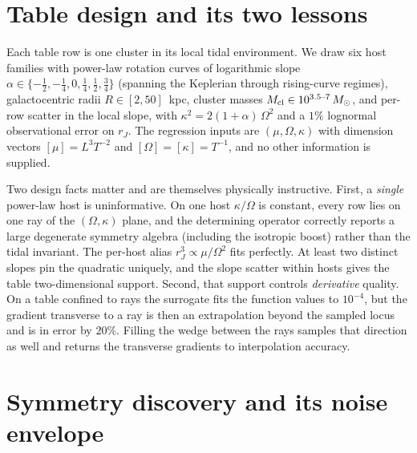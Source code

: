\documentclass[11pt]{article}
\begin{document}
\section{Table design and its two lessons}

Each table row is one cluster in its local tidal environment.  We draw
six host families with power-law rotation curves of logarithmic slope
$\alpha\in\{-\tfrac12,-\tfrac14,0,\tfrac14,\tfrac12,\tfrac34\}$
(spanning the Keplerian through rising-curve regimes), galactocentric
radii $R\in[2,50]$~kpc, cluster masses
$M_{\rm cl}\in10^{3.5\text{--}7}\,M_\odot$, and per-row scatter in the
local slope, with $\kappa^{2}=2(1+\alpha)\,\Omega^{2}$ and a $1\%$
lognormal observational error on $r_J$.  The regression inputs are
$(\mu,\Omega,\kappa)$ with dimension vectors $[\mu]=L^{3}T^{-2}$ and
$[\Omega]=[\kappa]=T^{-1}$, and no other information is supplied.

Two design facts matter and are themselves physically instructive.
First, a \emph{single} power-law host is uninformative.  On one host
$\kappa/\Omega$ is constant, every row lies on one ray of the
$(\Omega,\kappa)$ plane, and the determining operator correctly reports
a large degenerate symmetry algebra (including the isotropic boost)
rather than the tidal invariant.  The per-host alias
$r_J^{3}\propto\mu/\Omega^{2}$ fits perfectly.  At least two distinct
slopes pin the quadratic uniquely, and the slope scatter within hosts
gives the table two-dimensional support.  Second, that support controls
\emph{derivative} quality.  On a table confined to rays the surrogate
fits the function values to $10^{-4}$, but the gradient transverse to a
ray is then an extrapolation beyond the sampled locus and is in error by
$20\%$.  Filling the wedge between the rays samples that direction as
well and returns the transverse gradients to interpolation accuracy.

\section{Symmetry discovery and its noise envelope}
\end{document}
